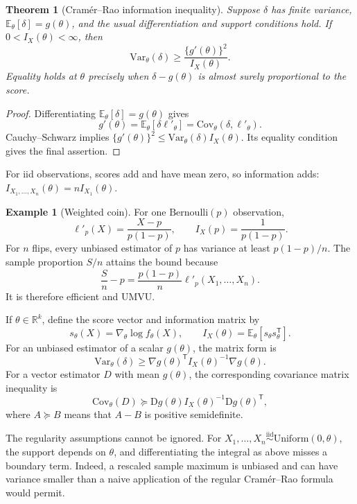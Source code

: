 \documentclass[12pt,oneside]{book}
\numberwithin{equation}{section}
\theoremstyle{definition}
\newtheorem{example}{Example}[section]
\theoremstyle{plain}
\newtheorem{theorem}{Theorem}[section]
\theoremstyle{remark}
\newcommand{\R}{\mathbb{R}}
\newcommand{\E}{\mathbb{E}}
\newcommand{\Var}{\mathrm{Var}}
\newcommand{\Cov}{\mathrm{Cov}}
\newcommand{\iid}{\overset{\text{iid}}{\sim}}
\newcommand{\grad}{\nabla}
\newcommand{\Bern}{\mathrm{Bernoulli}}
\begin{document}
\begin{theorem}[Cram\'er--Rao information inequality]
Suppose $\delta$ has finite variance,
$\E_\theta[\delta]=g(\theta)$, and the usual differentiation and support
conditions hold.  If $0<I_X(\theta)<\infty$, then
\begin{equation}
    \Var_\theta(\delta)
    \geq \frac{\{g'(\theta)\}^2}{I_X(\theta)}.
    \label{eq:cramer-rao-scalar}
\end{equation}
Equality holds at $\theta$ precisely when
$\delta-g(\theta)$ is almost surely proportional to the score.
\end{theorem}

\begin{proof}
Differentiating $\E_\theta[\delta]=g(\theta)$ gives
\[
 g'(\theta)=\E_\theta[\delta\ell'_\theta]
 =\Cov_\theta(\delta,\ell'_\theta).
\]
Cauchy--Schwarz implies
$\{g'(\theta)\}^2\leq\Var_\theta(\delta)I_X(\theta)$.  Its equality condition
gives the final assertion.
\end{proof}

For iid observations, scores add and have mean zero, so information adds:
$I_{X_1,\ldots,X_n}(\theta)=nI_{X_1}(\theta)$.

\begin{example}[Weighted coin]
For one $\Bern(p)$ observation,
\[
    \ell'_p(X)=\frac{X-p}{p(1-p)},
    \qquad I_X(p)=\frac{1}{p(1-p)}.
\]
For $n$ flips, every unbiased estimator of $p$ has variance at least
$p(1-p)/n$.  The sample proportion $S/n$ attains the bound because
\[
    \frac Sn-p=\frac{p(1-p)}{n}\ell'_p(X_1,\ldots,X_n).
\]
It is therefore efficient and UMVU.
\end{example}

If $\theta\in\R^k$, define the score vector and information matrix by
\[
    s_\theta(X)=\grad_\theta\log f_\theta(X),
    \qquad I_X(\theta)=\E_\theta[s_\theta s_\theta^\mathsf T].
\]
For an unbiased estimator of a scalar $g(\theta)$, the matrix form is
\begin{equation}
    \Var_\theta(\delta)
    \geq \grad g(\theta)^\mathsf T I_X(\theta)^{-1}
       \grad g(\theta).
    \label{eq:cramer-rao-matrix}
\end{equation}
For a vector estimator $D$ with mean $g(\theta)$, the corresponding covariance
matrix inequality is
\[
 \Cov_\theta(D)\succeq
 \mathrm Dg(\theta)I_X(\theta)^{-1}\mathrm Dg(\theta)^\mathsf T,
\]
where $A\succeq B$ means that $A-B$ is positive semidefinite.

The regularity assumptions cannot be ignored.  For
$X_1,\ldots,X_n\iid\mathrm{Uniform}(0,\theta)$, the support depends on
$\theta$, and differentiating the integral as above misses a boundary term.
Indeed, a rescaled sample maximum is unbiased and can have variance smaller
than a naive application of the regular Cram\'er--Rao formula would permit.
\end{document}
